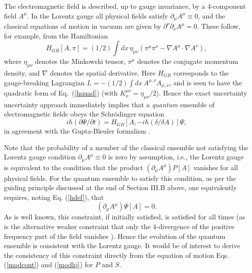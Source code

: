 \documentclass[a4paper,preprint, showpacs, aps, draft]{revtex4}
\begin{document}
{The electromagnetic field is described, up to gauge invariance, 
by a 4-component field
$A^\mu$.  In the Lorentz gauge all physical fields satisfy 
$\partial_\mu A^\mu\equiv 0$, and the classical 
equations of motion in vacuum are
given by $\partial^\nu\partial_\nu A^\mu=0$.  These follow,
for example, from the Hamiltonian \cite{schweber} 
\begin{equation} \label{emham}
H_{GB}[A,\pi] =
(1/2)\int dx\, \eta_{\mu\nu}\left(\pi^\mu\pi^\nu - \nabla A^\mu\cdot\nabla
A^\nu\right) ,
\end{equation}
where $\eta_{\mu\nu}$ denotes the Minkowski tensor, $\pi^\mu$ denotes
the conjugate momentum density, and $\nabla$ denotes the spatial
derivative. Here $H_{GB}$ corresponds to the gauge-breaking 
Lagrangian $L=-(1/2)\int dx\,A^{\mu,\nu}A_{\mu,\nu}$, and is seen 
to have the quadratic form of Eq.~(\ref{hquad}) 
(with $K^{\mu\nu}_x=\eta_{\mu\nu}/2$).  Hence the exact uncertainty  
uncertainty approach immediately implies that 
a {\it quantum} ensemble of electromagnetic fields obeys the Schr\"{o}dinger
equation
\begin{equation}
i\hbar(\partial\Psi/\partial t) = H_{GB}[A,-i\hbar(\delta/\delta A)]
\Psi ,
\end{equation} 
in agreement with the Gupta-Bleuler formalism \cite{schweber}.

Note that the probability of a member of the classical 
ensemble not satisfying the
Lorentz gauge condition $\partial_\mu A^\mu\equiv 0$ is zero by
assumption, i.e., the Lorentz gauge is equivalent to the condition
that the product $(\partial_\mu A^\mu) P[A]$ vanishes for all
physical fields.  For the quantum ensemble to satisfy this 
condition, as per the guiding principle discussed at the end of
Section III.B above, one equivalently requires,
noting Eq. (\ref{hdef}), that 
\[
(\partial_\mu A^\mu) \Psi[A] =0 .\]
As is well known, this constraint, if initially satisfied, is satisfied
for all times \cite{dirac} (as is the alternative weaker constraint that
only the 4-divergence of the positive frequency part of the field vanishes
\cite{schweber}). Hence the evolution of the quantum
ensemble is consistent with the Lorentz gauge.
It would be of interest to derive the consistency of this constraint
directly from the equation of motion Eqs. (\ref{modcont}) and
(\ref{modhj}) for $P$ and $S$.
 
}
\end{document}
